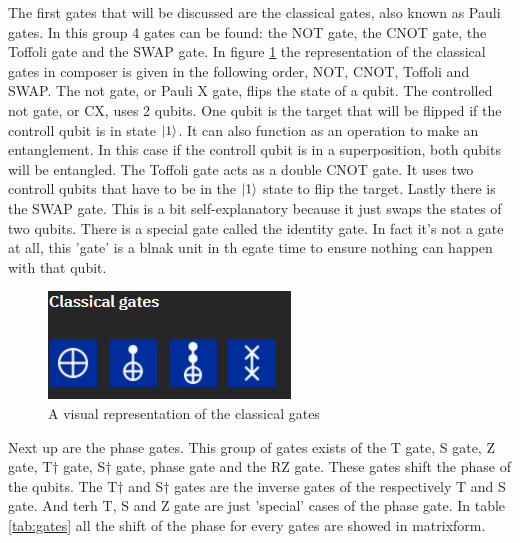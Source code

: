 The first gates that will be discussed are the classical gates, also known as Pauli gates. In this group 4 gates can be found: the NOT gate, the CNOT gate, the Toffoli gate and the SWAP gate.
In figure \ref{fig:classical gates} the representation of the classical gates in composer is given in the following order, NOT, CNOT, Toffoli and SWAP.
The not gate, or Pauli X gate, flips the state of a qubit. The controlled not gate, or CX, uses 2 qubits. One qubit is the target that will be flipped if the controll qubit is in state $\ket{1}$. It can also function as an operation to make an entanglement.
In this case if the controll qubit is in a superposition, both qubits will be entangled. The Toffoli gate acts as a double CNOT gate. It uses two controll qubits that have to be in the $\ket{1}$ state to flip the target.
Lastly there is the SWAP gate. This is a bit self-explanatory because it just swaps the states of two qubits. There is a special gate called the identity gate. In fact it's not a gate at all, this 'gate' is a blnak unit in th egate time to ensure nothing can happen with that qubit.

\begin{figure} [h]
    \centering
    \includegraphics[width=\textwidth]{img/classical-gates.PNG}
        \caption{A visual representation of the classical gates}
        \label{fig:classical gates}
\end{figure}

Next up are the phase gates. This group of gates exists of the T gate, S gate, Z gate, T$\dagger$ gate, S$\dagger$ gate, phase gate and the RZ gate. These gates shift the phase of the qubits.
The T$\dagger$ and S$\dagger$ gates are the inverse gates of the respectively T and S gate. And terh T, S and Z gate are just 'special' cases of the phase gate.
In table \ref{tab:gates} all the shift of the phase for every gates are showed in matrixform.


